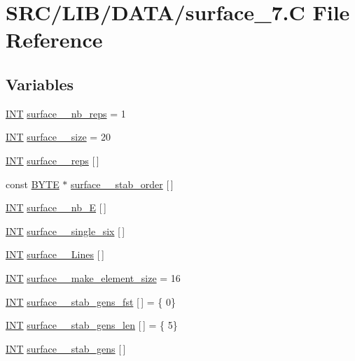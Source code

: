 \hypertarget{surface__7_8_c}{}\section{S\+R\+C/\+L\+I\+B/\+D\+A\+T\+A/surface\+\_\+7.C File Reference}
\label{surface__7_8_c}
\subsection*{Variables}
\begin{DoxyCompactItemize}
\item 
\mbox{\hyperlink{galois_8h_a09fddde158a3a20bd2dcadb609de11dc}{I\+NT}} \mbox{\hyperlink{surface__7_8_c_aac0d46a2e74332936a3d00ba4a28e18f}{surface\+\_\+\_\+nb\+\_\+reps}} = 1
\item 
\mbox{\hyperlink{galois_8h_a09fddde158a3a20bd2dcadb609de11dc}{I\+NT}} \mbox{\hyperlink{surface__7_8_c_adfc09e7944557375080f329c3d4409e4}{surface\+\_\+\_\+size}} = 20
\item 
\mbox{\hyperlink{galois_8h_a09fddde158a3a20bd2dcadb609de11dc}{I\+NT}} \mbox{\hyperlink{surface__7_8_c_a709c35022a4d31dbc90e800aa7785c12}{surface\+\_\+\_\+reps}} \mbox{[}$\,$\mbox{]}
\item 
const \mbox{\hyperlink{galois_8h_ab6cc7b4aeb6ea31aba2b3fbfc83ff5e6}{B\+Y\+TE}} $\ast$ \mbox{\hyperlink{surface__7_8_c_abffd103f71174fa8eb6c5f90e7401a15}{surface\+\_\+\_\+stab\+\_\+order}} \mbox{[}$\,$\mbox{]}
\item 
\mbox{\hyperlink{galois_8h_a09fddde158a3a20bd2dcadb609de11dc}{I\+NT}} \mbox{\hyperlink{surface__7_8_c_a08bb0d5d50000c29330543cc180468c8}{surface\+\_\+\_\+nb\+\_\+E}} \mbox{[}$\,$\mbox{]}
\item 
\mbox{\hyperlink{galois_8h_a09fddde158a3a20bd2dcadb609de11dc}{I\+NT}} \mbox{\hyperlink{surface__7_8_c_a456724c61c95ef70c6001cd7383d9814}{surface\+\_\+\_\+single\+\_\+six}} \mbox{[}$\,$\mbox{]}
\item 
\mbox{\hyperlink{galois_8h_a09fddde158a3a20bd2dcadb609de11dc}{I\+NT}} \mbox{\hyperlink{surface__7_8_c_a4c48e6df8da715f4482efed463f89df8}{surface\+\_\+\_\+\+Lines}} \mbox{[}$\,$\mbox{]}
\item 
\mbox{\hyperlink{galois_8h_a09fddde158a3a20bd2dcadb609de11dc}{I\+NT}} \mbox{\hyperlink{surface__7_8_c_a58d40b98e55ce29c0efe58f4f105e58b}{surface\+\_\+\_\+make\+\_\+element\+\_\+size}} = 16
\item 
\mbox{\hyperlink{galois_8h_a09fddde158a3a20bd2dcadb609de11dc}{I\+NT}} \mbox{\hyperlink{surface__7_8_c_aa2aba951f5c495fc45b18b2d2eb83dc7}{surface\+\_\+\_\+stab\+\_\+gens\+\_\+fst}} \mbox{[}$\,$\mbox{]} = \{ 0\}
\item 
\mbox{\hyperlink{galois_8h_a09fddde158a3a20bd2dcadb609de11dc}{I\+NT}} \mbox{\hyperlink{surface__7_8_c_ab02497b0a3919689a98ffe5e501e46ac}{surface\+\_\+\_\+stab\+\_\+gens\+\_\+len}} \mbox{[}$\,$\mbox{]} = \{ 5\}
\item 
\mbox{\hyperlink{galois_8h_a09fddde158a3a20bd2dcadb609de11dc}{I\+NT}} \mbox{\hyperlink{surface__7_8_c_a492697b7bfdcaea0ac80e69704916bc4}{surface\+\_\+\_\+stab\+\_\+gens}} \mbox{[}$\,$\mbox{]}
\end{DoxyCompactItemize}


